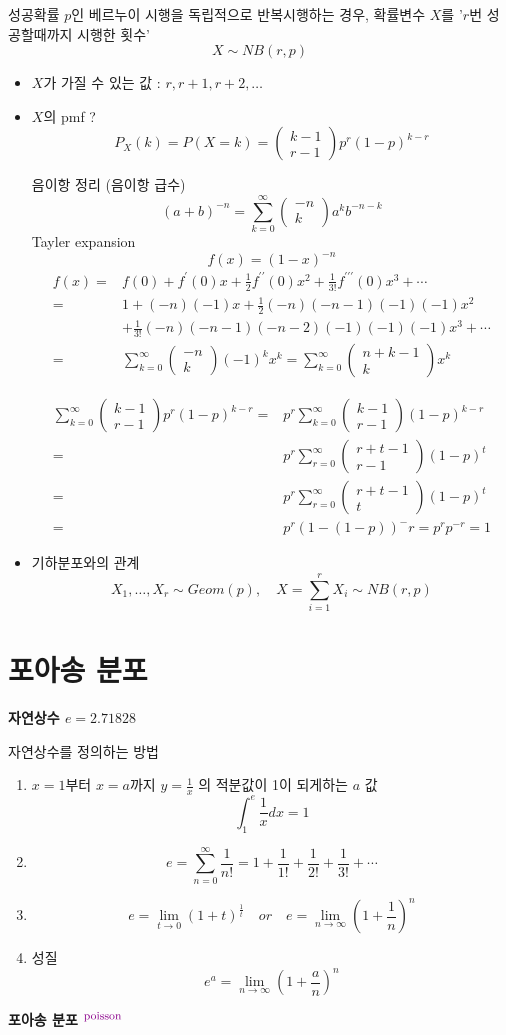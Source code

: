 \documentclass{oblivoir}
\newcommand{\DC}[1]{\textcolor{DarkMagenta}{#1}}%
\newcommand{\UP}[1]{$^{\mbox{\DC{\footnotesize #1}}}$}
\newcommand{\mat}[2]{\begin{pmatrix} #1 \\ #2 \end{pmatrix}}
\begin{document}
성공확률 $p$인 베르누이 시행을 독립적으로 반복시행하는 경우, 확률변수 $X$를 '$r$번 성공할때까지 시행한 횟수'
$$
X \sim NB(r,p)
$$
\begin{itemize}
\item $X$가 가질 수 있는 값 : $r, r+1, r+2, \ldots$
\item $X$의 pmf ?
$$
P_X(k) = P(X = k) = \mat{k-1}{r-1} p^r (1-p)^{k-r} 
$$
\begin{myframe}{음이항 정리 (음이항 급수)}
$$
(a + b)^{-n} = \sum_{k=0}^{\infty} \mat{-n}{k} a^k b^{-n-k}
$$
Tayler expansion
$$
f(x) = (1-x)^{-n}
$$
\begin{align*}
f(x) =& f(0) + f^{\prime}(0) x + \frac{1}{2} f^{\prime\prime}(0) x^2 + \frac{1}{3!} f^{\prime\prime\prime}(0) x^3 + \cdots \\
=& 1 + (-n)(-1) x + \frac{1}{2} (-n)(-n-1)(-1)(-1) x^2 \\
& + \frac{1}{3!} (-n)(-n-1)(-n-2)(-1)(-1)(-1) x^3 + \cdots \\
=& \sum_{k=0}^{\infty} \mat{-n}{k} (-1)^k x^k = \sum_{k=0}^{\infty} \mat{n+k-1}{k} x^k 
\end{align*}
\end{myframe}
\begin{align*}
\sum_{k=0}^{\infty} \mat{k-1}{r-1} p^r (1-p)^{k-r}  =& p^r  \sum_{k=0}^{\infty} \mat{k-1}{r-1} (1-p)^{k-r} \\
=& p^r \sum_{r=0}^{\infty} \mat{r+t-1}{r-1} (1-p)^t \\
=&  p^r \sum_{r=0}^{\infty} \mat{r+t-1}{t} (1-p)^t \\
=& p^r(1-(1-p))^-r = p^r p^{-r} = 1
\end{align*}
\item 기하분포와의 관계
$$
X_1, \dots, X_r \sim Geom(p), \quad X = \sum_{i=1}^r X_i \sim NB(r, p)
$$
\end{itemize}

\section{포아송 분포}
\textbf{자연상수 $e = 2.71828$}

자연상수를 정의하는 방법
\begin{enumerate}
\item $x=1$부터 $x = a$까지 $y = \frac{1}{x}$ 의 적분값이 1이 되게하는 $a$ 값
$$
\int_1^e \frac{1}{x} dx = 1
$$
\item
$$
e = \sum_{n=0}^{\infty} \frac{1}{n!} = 1 + \frac{1}{1!} + \frac{1}{2!} + \frac{1}{3!} + \cdots
$$
\item
$$
e = \lim_{t \rightarrow 0} (1 + t)^{\frac{1}{t}} \quad or \quad e = \lim_{n \rightarrow \infty} \left ( 1 + \frac{1}{n} \right)^n
$$
\item 성질
$$
e^a = \lim_{n \rightarrow \infty} \left ( 1 + \frac{a}{n} \right)^n
$$
\end{enumerate}
\textbf{포아송 분포 \UP{poisson}}
\end{document}
